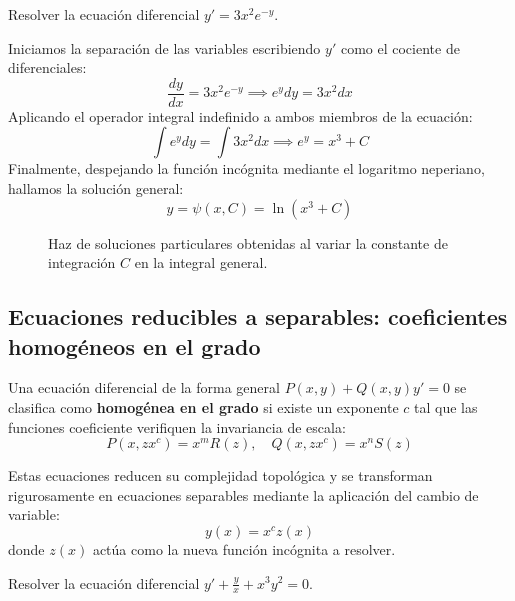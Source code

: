 \begin{ejercicio}
Resolver la ecuación diferencial $y' = 3x^2 e^{-y}$.
\end{ejercicio}

\begin{tcolorbox}
Iniciamos la separación de las variables escribiendo $y'$ como el cociente de diferenciales:
$$ \frac{dy}{dx} = 3x^2 e^{-y} \implies e^y dy = 3x^2 dx $$
Aplicando el operador integral indefinido a ambos miembros de la ecuación:
$$ \int e^y dy = \int 3x^2 dx \implies e^y = x^3 + C $$
Finalmente, despejando la función incógnita mediante el logaritmo neperiano, hallamos la solución general:
$$ y = \psi(x,C) = \ln(x^3 + C) $$
\begin{figure}[H]
    \centering
    
    \caption{Haz de soluciones particulares obtenidas al variar la constante de integración $C$ en la integral general.}
\end{figure}
\end{tcolorbox}

\subsection{Ecuaciones reducibles a separables: coeficientes homogéneos en el grado}

Una ecuación diferencial de la forma general $P(x,y) + Q(x,y)y' = 0$ se clasifica como \textbf{homogénea en el grado} si existe un exponente $c$ tal que las funciones coeficiente verifiquen la invariancia de escala:
$$ P(x, zx^c) = x^m R(z), \quad Q(x, zx^c) = x^n S(z) $$

Estas ecuaciones reducen su complejidad topológica y se transforman rigurosamente en ecuaciones separables mediante la aplicación del cambio de variable:
$$ y(x) = x^c z(x) $$
donde $z(x)$ actúa como la nueva función incógnita a resolver.

\begin{ejercicio}
Resolver la ecuación diferencial $y' + \frac{y}{x} + x^3y^2 = 0$.
\end{ejercicio}

